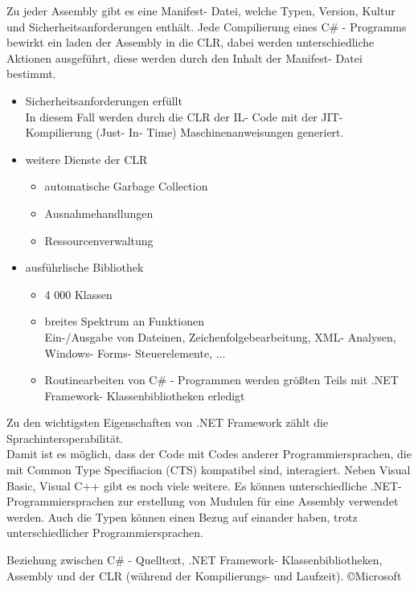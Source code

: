\documentclass[12pt,a4paper]{report}
\begin{document}
Zu jeder Assembly gibt es eine Manifest- Datei, welche Typen, Version, Kultur und Sicherheitsanforderungen enthält. Jede Compilierung eines C\# - Programms bewirkt ein laden der Assembly in die CLR, dabei werden unterschiedliche Aktionen ausgeführt, diese werden durch den Inhalt der Manifest- Datei bestimmt. \\
\begin{itemize}
\item Sicherheitsanforderungen erfüllt\\
In diesem Fall werden durch die CLR der IL- Code mit der JIT- Kompilierung (Just- In- Time) Maschinenanweisungen generiert.
\item weitere Dienste der CLR
\begin{itemize}
\item automatische Garbage Collection
\item Ausnahmehandlungen
\item Ressourcenverwaltung
\end{itemize}
\item ausführlische Bibliothek
\begin{itemize}
\item 4 000 Klassen
\item breites Spektrum an Funktionen\\
Ein-/Ausgabe von Dateinen, Zeichenfolgebearbeitung, XML- Analysen, Windows- Forms- Steuerelemente, ...
\item Routinearbeiten von C\# - Programmen werden größten Teils mit .NET Framework- Klassenbibliotheken erledigt
\end{itemize}
\end{itemize}
Zu den wichtigsten Eigenschaften von .NET Framework zählt die Sprachinteroperabilität.\\

Damit ist es möglich, dass der Code mit Codes anderer Programmiersprachen, die mit Common Type Specifiacion (CTS) kompatibel sind, interagiert. Neben Visual Basic, Visual C++ gibt es noch viele weitere. Es können unterschiedliche .NET- Programmiersprachen zur erstellung von Mudulen für eine Assembly verwendet werden. Auch die Typen können einen Bezug auf einander haben, trotz unterschiedlicher Programmiersprachen.
\begin{center}
Beziehung zwischen C\# - Quelltext, .NET Framework- Klassenbibliotheken, Assembly und der CLR (während der Kompilierungs- und Laufzeit).
\copyright Microsoft
\end{center}
\end{document}
